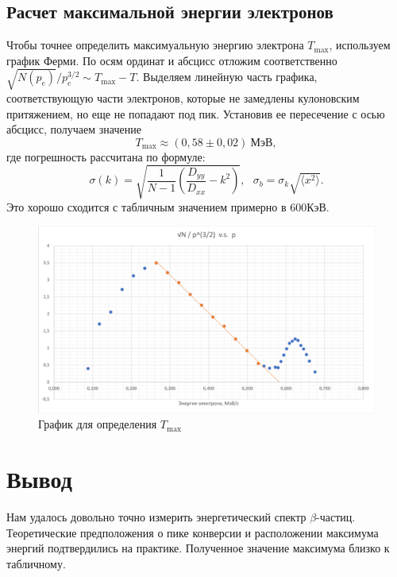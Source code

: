 \documentclass[a4paper,12pt]{article} %
\begin{document}
\subsection{Расчет максимальной энергии электронов}
Чтобы точнее определить максимуальную энергию электрона $T_\text{max}$, используем график Ферми. По осям ординат и абсцисс отложим соответственно 
$\sqrt{N(p_e)} / p_e^{3/2} \sim T_\text{max} - T$. Выделяем линейную часть графика, соответствующую части электронов, которые не замедлены кулоновским притяжением, но еще не попадают под пик. Установив ее пересечение с осью абсцисс, получаем значение 
\[
T_\text{max} \approx (0,58 \pm 0,02)~ \text{МэВ},
\]
где погрешность рассчитана по формуле:
\begin{equation*}
\sigma(k) = \sqrt{\frac {1}{N - 1} \left(\frac{D_{yy}}{D_{xx}} - k^2 \right)}, ~~~ \sigma_b = \sigma_k  \sqrt{\langle x^2 \rangle}.
\end{equation*}
Это хорошо сходится с табличным значением примерно в $600 \text{КэВ}$.

\begin{figure}[h]
    \centering
    \includegraphics[width=1\textwidth]{Plot2.png}
    \caption{График для определения $T_\text{max}$}
    \label{fig:plot2}
\end{figure}

\section{Вывод}
Нам удалось довольно точно измерить энергетический спектр $\beta$-частиц. Теоретические предположения о пике конверсии и расположении максимума энергий подтвердились на практике. Полученное значение максимума близко к табличному.

\newpage
\end{document}
